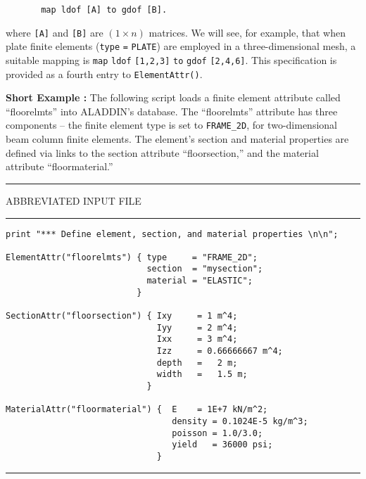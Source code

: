 \begin{footnotesize}
\begin{verbatim}
       map ldof [A] to gdof [B].
\end{verbatim}
\end{footnotesize}

\vspace{0.15 in}\noindent
where {\tt [A]} and {\tt [B]} are {\tt $(1 \times n)$} matrices.
We will see, for example, that when plate finite
elements ({\tt type} {\tt =} {\tt PLATE}) are employed in a three-dimensional mesh,
a suitable mapping is {\tt map} {\tt ldof} {\tt [1,2,3]} {\tt to} {\tt gdof} {\tt [2,4,6]}.
This specification is provided as a fourth entry to {\tt ElementAttr()}.

\vspace{0.15 in}\noindent
{\bf Short Example :} The following script loads a finite element attribute
called ``floorelmts'' into ALADDIN's database. The ``floorelmts'' attribute
has three components -- the finite element type is set to {\tt FRAME\_2D},
for two-dimensional beam column finite elements. The element's section
and material properties are defined via links to the section
attribute ``floorsection,'' and the material attribute ``floormaterial.''

\vspace{0.15 in}
\begin{footnotesize}
\noindent
{\rule{2.1 in}{0.035 in} ABBREVIATED INPUT FILE \rule{2.1 in}{0.035 in} }
\begin{verbatim}
print "*** Define element, section, and material properties \n\n";

ElementAttr("floorelmts") { type     = "FRAME_2D";
                            section  = "mysection";
                            material = "ELASTIC";
                          }

SectionAttr("floorsection") { Ixy     = 1 m^4;
                              Iyy     = 2 m^4;
                              Ixx     = 3 m^4;
                              Izz     = 0.66666667 m^4;
                              depth   =   2 m;
                              width   =   1.5 m;
                            }

MaterialAttr("floormaterial") {  E    = 1E+7 kN/m^2;
                                 density = 0.1024E-5 kg/m^3;
                                 poisson = 1.0/3.0;
                                 yield   = 36000 psi;
                              }
\end{verbatim}
\rule{6.25 in}{0.035 in}
\end{footnotesize}


